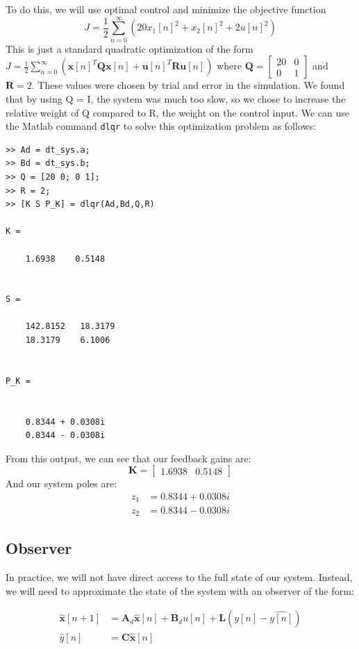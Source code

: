 \documentclass[11pt]{article}
\begin{document}
To do this, we will use optimal control and minimize the objective function 
\[
J = \frac{1}{2}\sum_{n=0}^{\infty}\left(20x_1[n]^2 + x_2[n]^2 +2u[n]^2 \right) 
\]
This is just a standard quadratic optimization of the form $J = \frac{1}{2}\sum\limits_{n=0}^{\infty}\left(\mathbf{x}[n]^T\mathbf{Qx}[n] + \mathbf{u}[n]^T\mathbf{Ru}[n] \right) $ where $\mathbf{Q} = \begin{bmatrix}20 & 0\\0 & 1\end{bmatrix}$ and $\mathbf{R} = 2$. 
These values were chosen by trial and error in the simulation.
We found that by using Q = I, the system was much too slow, so we chose to increase the relative weight of Q compared to R, the weight on the control input.
We can use the Matlab command {\tt dlqr} to solve this optimization problem as follows:
\small
\begin{verbatim}
>> Ad = dt_sys.a;
>> Bd = dt_sys.b;
>> Q = [20 0; 0 1];
>> R = 2;
>> [K S P_K] = dlqr(Ad,Bd,Q,R)

K =

    1.6938    0.5148


S =

    142.8152   18.3179
    18.3179    6.1006


P_K =


    0.8344 + 0.0308i
    0.8344 - 0.0308i
\end{verbatim}\normalsize

From this output, we can see that our feedback gains are:
\[\mathbf{K} = \begin{bmatrix} 1.6938 & 0.5148\end{bmatrix}\]
And our system poles are:
\begin{align*}
z_1 &= 0.8344 + 0.0308i \\ z_2 &= 0.8344 - 0.0308i
\end{align*}

\subsection*{Observer}
In practice, we will not have direct access to the full state of our system.
Instead, we will need to approximate the state of the system with an observer of the form:

\begin{align*}
\hat{\mathbf{x}}[n+1] &= \mathbf{A}_d\hat{\mathbf{x}}[n]+ \mathbf{B}_d u[n] + \mathbf{L}(y[n]-\hat{y[n]} )\\
\hat{y}[n] &= \mathbf{C}\hat{\mathbf{x}}[n]
\end{align*}
\end{document}
